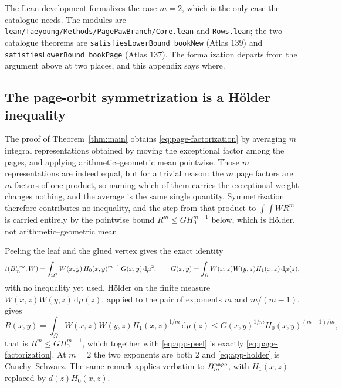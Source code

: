 \documentclass[11pt]{article}
\newcommand{\dd}{\,\mathrm d}
\begin{document}
The Lean development formalizes the case $m=2$, which is the only case the
catalogue needs.  The modules are
\texttt{lean/Taeyoung/Methods/PagePawBranch/Core.lean} and
\texttt{Rows.lean}; the two catalogue theorems are
\texttt{satisfiesLowerBound\_bookNew} (Atlas $139$) and
\texttt{satisfiesLowerBound\_bookPage} (Atlas $137$).  The formalization
departs from the argument above at two places, and this appendix says where.


\subsection{The page-orbit symmetrization is a H\"older inequality}
\label{sec:app-symmetrization}

The proof of Theorem~\ref{thm:main} obtains \eqref{eq:page-factorization} by
averaging $m$ integral representations obtained by moving the exceptional
factor among the pages, and applying arithmetic--geometric mean pointwise.
Those $m$ representations are indeed equal, but for a trivial reason: the $m$
page factors are $m$ factors of one product, so naming which of them carries
the exceptional weight changes nothing, and the average is the same single
quantity.  Symmetrization therefore contributes no inequality, and the step
from that product to $\int\!\!\int WR^m$ is carried entirely by the pointwise
bound $R^m\leq GH_0^{m-1}$ below, which is H\"older, not
arithmetic--geometric mean.

Peeling the leaf and the glued vertex gives the exact identity
\begin{equation}
 t(B_m^{\rm new},W)
 =\int_{\Omega^2}W(x,y)\,H_0(x,y)^{m-1}\,G(x,y)\dd\mu^2,
 \qquad
 G(x,y)=\int_\Omega W(x,z)W(y,z)H_1(x,z)\dd\mu(z),
 \label{eq:app-peel}
\end{equation}
with no inequality yet used.  H\"older on the finite measure
$W(x,z)W(y,z)\dd\mu(z)$, applied to the pair of exponents $m$ and $m/(m-1)$,
gives
\begin{equation}
 R(x,y)=\int_\Omega W(x,z)W(y,z)H_1(x,z)^{1/m}\dd\mu(z)
 \leq G(x,y)^{1/m}H_0(x,y)^{(m-1)/m},
 \label{eq:app-holder}
\end{equation}
that is $R^m\leq GH_0^{m-1}$, which together with \eqref{eq:app-peel} is
exactly \eqref{eq:page-factorization}.  At $m=2$ the two exponents are both
$2$ and \eqref{eq:app-holder} is Cauchy--Schwarz.  The same remark applies
verbatim to $B_m^{\rm page}$, with $H_1(x,z)$ replaced by $d(z)H_0(x,z)$.
\end{document}

